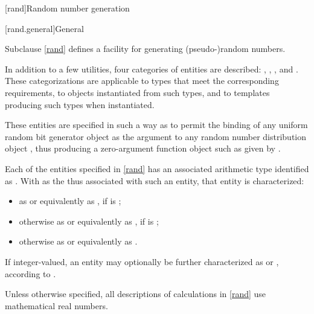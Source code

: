[rand]{Random number generation}

[rand.general]{General}

%
%
%
%

\pnum
Subclause \ref{rand} defines a facility
for generating (pseudo-)random numbers.

\pnum
In addition to a few utilities,
four categories of entities are described:
,
,
,
and
.
These categorizations are applicable
to types that meet the corresponding requirements,
to objects instantiated from such types,
and to templates producing such types when instantiated.
\begin{note}
 These entities are specified in such a way
 as to permit the binding
 of any uniform random bit generator object 
 as the argument
 to any random number distribution object ,
 thus producing a zero-argument function object
 such as given by
 .
\end{note}

\pnum
Each of the entities specified in \ref{rand}
has an associated arithmetic type
identified as .
With  as the 
thus associated with such an entity,
that entity is characterized:
\begin{itemize}
 \item
   as  or equivalently as ,
   if  is ;
 \item
   otherwise
   as  or equivalently as ,
   if  is ;
 \item
   otherwise
   as  or equivalently as .
\end{itemize}
\noindent
If integer-valued,
an entity may optionally be further characterized as
 or ,
according to .

\pnum
Unless otherwise specified,
all descriptions of calculations
in \ref{rand}
use mathematical real numbers.

